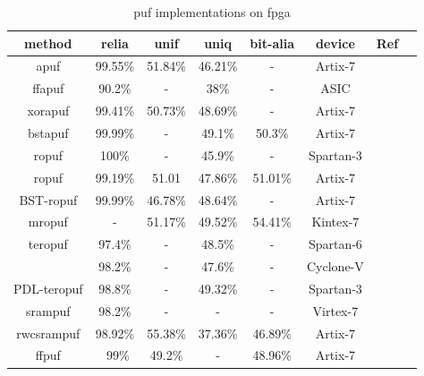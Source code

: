\begin{table}[H]
    \centering
    \begin{tabular}{|c|c|c|c|c|c|c|c|}
         \hline
         \textbf{method} & \textbf{\acrshort{relia}} & \textbf{\acrshort{unif}} & \textbf{\acrshort{uniq}} & \textbf{\acrshort{bit-alia}} & \textbf{device} & \textbf{Ref}\\
         \hline\hline
         \acrshort{apuf} & 99.55\% & 51.84\% & 46.21\% & -  & Artix-7 & \cite{anandakumar_implementation_2022}\\
         \hline
         \acrshort{ffapuf}& 90.2\% & - & 38\% & - & ASIC & \cite{lee_technique_2004}\\
         \hline
         \acrshort{xorapuf} & 99.41\% & 50.73\% & 48.69\% &  - & Artix-7 & \cite{anandakumar_implementation_2022}\\
         \hline
         \acrshort{bstapuf} & 99.99\% & - & 49.1\% & 50.3\% &  Artix-7 & \cite{he_highly_2020}\\
         \hline
         \acrshort{ropuf} & 100\% & - & 45.9\% & - &  Spartan-3 & \cite{maiti_improved_2009}\\
         \hline
         \acrshort{ropuf} & 99.19\% & 51.01 & 47.86\% & 51.01\% & Artix-7 & \cite{de_weerdt_implementation_2021}\\
         \hline
         BST-\acrshort{ropuf} & 99.99\% & 46.78\% & 48.64\% & - & Artix-7 & \cite{he_highly_2021}\\
         \hline
         \acrshort{mropuf} & - & 51.17\% & 49.52\% & 54.41\% & Kintex-7 & \cite{yao_m-ro_2022}\\
         \hline
         \acrshort{teropuf} & 97.4\% & - & 48.5\% & - & Spartan-6 & \cite{marchand_implementation_2017}\\
          & 98.2\% & - & 47.6\% & - & Cyclone-V & \cite{marchand_implementation_2017}\\
         \hline
         PDL-\acrshort{teropuf} & 98.8\% & - & 49.32\% & - & Spartan-3 & \cite{ardakani_improving_2018}\\
         \hline
         \acrshort{srampuf} & 98.2\% & - & - & - & Virtex-7 & \cite{usmani_applications_2018}\\
         \hline
         \acrshort{rwcsrampuf} & 98.92\% & 55.38\% & 37.36\% & 46.89\% & Artix-7 & \cite{cicek_new_2022}\\
         \hline
         \acrshort{ffpuf} & ~99\% & 49.2\% & - & 48.96\% & Artix-7 & \cite{khan_symmetric_2020}\\
         \hline
         
    \end{tabular}
    \caption{\acrshort{puf} implementations on \acrshort{fpga}}
    \label{tab:soa_impl}
\end{table}



